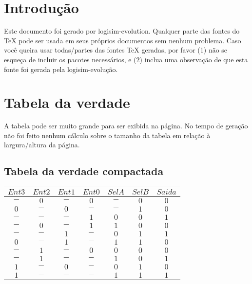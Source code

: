 \documentclass [15pt,a4paper,twoside]{article}
\begin{document}
\section{Introdução}
Este documento foi gerado por logisim-evolution. Qualquer parte das fontes do TeX pode ser usada em seus próprios documentos sem nenhum problema. Caso você queira usar todas/partes das fontes TeX geradas, por favor (1) não se esqueça de incluir os pacotes necessários, e (2) inclua uma observação de que esta fonte foi gerada pela logisim-evolução.
\section{Tabela da verdade}
A tabela pode ser muito grande para ser exibida na página. No tempo de geração não foi feito nenhum cálculo sobre o tamanho da tabela em relação à largura/altura da página.
\subsection{Tabela da verdade compactada}
\begin{center}
\begin{tabular}{cccccc|c}
$Ent3$&$Ent2$&$Ent1$&$Ent0$&$SelA$&$SelB$&$Saida$\\
\hline
$-$&$0$&$-$&$0$&$-$&$0$&$0$\\
$0$&$-$&$0$&$-$&$-$&$1$&$0$\\
$-$&$-$&$-$&$1$&$0$&$0$&$1$\\
$-$&$0$&$-$&$1$&$1$&$0$&$0$\\
$-$&$-$&$1$&$-$&$0$&$1$&$1$\\
$0$&$-$&$1$&$-$&$1$&$1$&$0$\\
$-$&$1$&$-$&$0$&$0$&$0$&$0$\\
$-$&$1$&$-$&$-$&$1$&$0$&$1$\\
$1$&$-$&$0$&$-$&$0$&$1$&$0$\\
$1$&$-$&$-$&$-$&$1$&$1$&$1$\\

\end{tabular}
\end{center}
\end{document}
